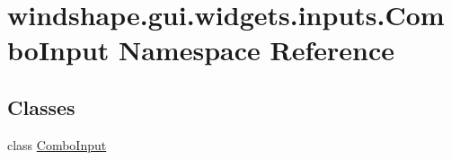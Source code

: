 \hypertarget{namespacewindshape_1_1gui_1_1widgets_1_1inputs_1_1_combo_input}{}\section{windshape.\+gui.\+widgets.\+inputs.\+Combo\+Input Namespace Reference}
\label{namespacewindshape_1_1gui_1_1widgets_1_1inputs_1_1_combo_input}
\subsection*{Classes}
\begin{DoxyCompactItemize}
\item 
class \mbox{\hyperlink{classwindshape_1_1gui_1_1widgets_1_1inputs_1_1_combo_input_1_1_combo_input}{Combo\+Input}}
\end{DoxyCompactItemize}
